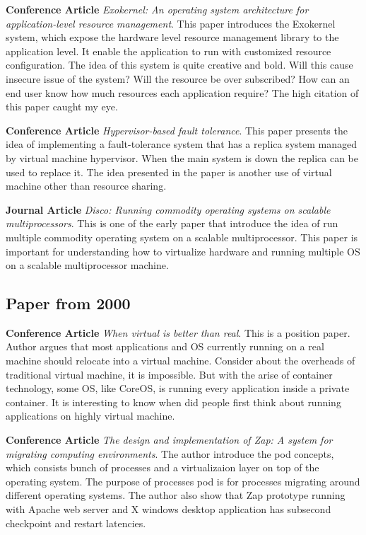 \documentclass{article}
\begin{document}
\medskip

\textbf{Conference Article} \emph{Exokernel: An operating system architecture for application-level 
resource management}\cite{engler1995exokernel}. This paper introduces the Exokernel system, which 
expose the hardware level resource management library to the application level. It enable the 
application to run with customized resource configuration. The idea of this system is quite 
creative and bold. Will this cause insecure issue of the system? Will the resource be over 
subscribed? How can an end user know how much resources each application require? The high 
citation of this paper caught my eye.

\medskip

\textbf{Conference Article} \emph{Hypervisor-based fault tolerance}\cite{bressoud1995hypervisor}.
This paper presents the idea of implementing a fault-tolerance system that has a replica system 
managed by virtual machine hypervisor. When the main system is down the replica can be used to 
replace it. The idea presented in the paper is another use of virtual machine other than 
resource sharing.

\medskip 

\textbf{Journal Article} \emph{Disco: Running commodity operating systems on scalable 
multiprocessors}\cite{bugnion1997disco}. This is one of the early paper that introduce the 
idea of run multiple commodity operating system on a scalable multiprocessor. This paper is 
important for understanding how to virtualize hardware and running multiple OS on a scalable 
multiprocessor machine.

\subsection{Paper from 2000}

\textbf{Conference Article} \emph{When virtual is better than real}\cite{chen2001virtual}. This is
a position paper. Author argues that most applications and OS currently running on a real machine 
should relocate into a virtual machine. Consider about the overheads of traditional virtual machine,
it is impossible. But with the arise of container technology, some OS, like CoreOS, is running 
every application inside a private container. It is interesting to know when did people first think 
about running applications on highly virtual machine.

\medskip

\textbf{Conference Article} \emph{The design and implementation of Zap: A system for migrating 
computing environments}\cite{osman2002design}. The author introduce the pod concepts, which 
consists bunch of processes and a virtualizaion layer on top of the operating system. The purpose
of processes pod is for processes migrating around different operating systems. The author also 
show that Zap prototype running with Apache web server and X windows desktop application has 
subsecond checkpoint and restart latencies.
\end{document}
